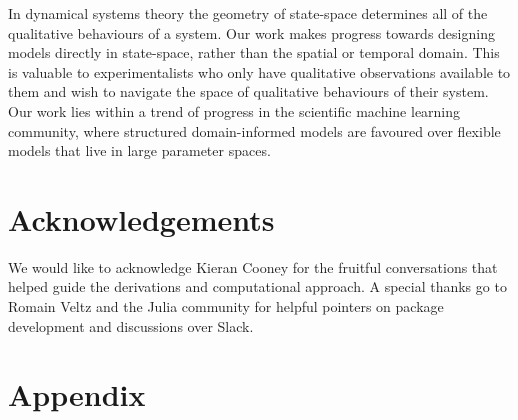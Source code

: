 \documentclass{article}
\begin{document}
In dynamical systems theory the geometry of state-space determines all of the qualitative behaviours of a system. Our work makes progress towards designing models directly in state-space, rather than the spatial or temporal domain. This is valuable to experimentalists who only have qualitative observations available to them and wish to navigate the space of qualitative behaviours of their system. Our work lies within a trend of progress in the scientific machine learning community, where structured domain-informed models are favoured over flexible models that live in large parameter spaces.

\section{Acknowledgements}
We would like to acknowledge Kieran Cooney for the fruitful conversations that helped guide the derivations and computational approach. A special thanks go to Romain Veltz and the Julia community for helpful pointers on package development and discussions over Slack.




\clearpage{}\setcounter{page}{1}
\section*{Appendix}
\appendix

\end{document}

